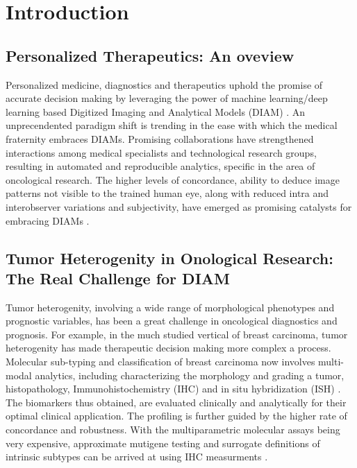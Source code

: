 \documentclass[final,1p,times,twocolumn]{elsarticle}
\begin{document}

\section{Introduction}
\label{S:1}

\subsection{Personalized Therapeutics: An oveview}

Personalized medicine, diagnostics and therapeutics uphold the promise of accurate decision making by leveraging the power of machine learning/deep learning based Digitized Imaging and Analytical Models (DIAM) \cite{1}\cite{2}\cite{d}\cite{e}. An unprecendented paradigm shift is trending in the ease with which the medical fraternity embraces DIAMs. Promising collaborations have strengthened interactions among medical specialists and technological research groups, resulting in automated and reproducible analytics, specific in the area of oncological research. The higher levels of concordance, ability to deduce image patterns not visible to the trained human eye, along with reduced intra and interobserver variations and subjectivity, have emerged as promising catalysts for embracing DIAMs \cite{3}.


\subsection{Tumor Heterogenity in Onological Research: The Real Challenge for DIAM}

Tumor heterogenity, involving a wide range of morphological phenotypes and prognostic variables, has been a great challenge in oncological diagnostics and prognosis. For example, in the much studied vertical of breast carcinoma, tumor heterogenity has made therapeutic decision making more complex a process. Molecular sub-typing and classification of breast carcinoma now involves multi-modal analytics, including characterizing the morphology and grading a tumor, histopathology, Immunohistochemistry (IHC) and in situ hybridization (ISH) \cite{4}. The biomarkers thus obtained, are evaluated clinically and analytically for their optimal clinical application. The profiling is further guided by the higher rate of concordance and robustness. With the multiparametric molecular assays being very expensive, approximate mutigene testing and surrogate definitions of intrinsic subtypes can be arrived at using IHC measurments \cite{5}.
\end{document}
